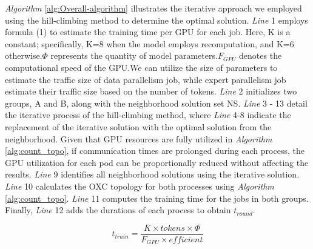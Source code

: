 \documentclass[conference]{IEEEtran}
\begin{document}

\emph{Algorithm} \ref{alg:Overall-algorithm} illustrates the iterative approach we employed using the hill-climbing method to determine the optimal solution. \emph{Line} 1 employs formula (1) to estimate the training time per GPU for each job. Here, K is a constant; specifically, K=8 when the model employs recomputation, and K=6 otherwise.$\Phi$ represents the quantity of model parameters.$F_{GPU}$ denotes the computational speed of the GPU.We can utilize the size of parameters to estimate the traffic size of data parallelism job, while expert parallelism job estimate their traffic size based on the number of tokens. \emph{Line} 2 initializes two groups, A and B, along with the neighborhood solution set NS. \emph{Line} 3 - 13 detail the iterative process of the hill-climbing method, where \emph{Line} 4-8 indicate the replacement of the iterative solution with the optimal solution from the neighborhood. Given that GPU resources are fully utilized in \emph{Algorithm} \ref{alg:count_topo}, if communication times are prolonged during each process, the GPU utilization for each pod can be proportionally reduced without affecting the results. \emph{Line} 9 identifies all neighborhood solutions using the iterative solution. \emph{Line} 10 calculates the OXC topology for both processes using \emph{Algorithm} \ref{alg:count_topo}. \emph{Line} 11 computes the training time for the jobs in both groups. Finally, \emph{Line} 12 adds the durations of each process to obtain $t_{round}$.

\begin{equation}
	t_{train} = \dfrac{K \times tokens \times \Phi}{F_{GPU} \times efficient}
\end{equation}
\end{document}
